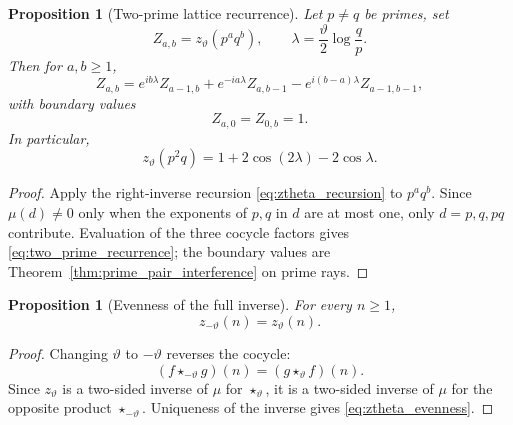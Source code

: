\documentclass[11pt]{amsart}
\numberwithin{equation}{section}
\theoremstyle{plain}
\newtheorem{proposition}[theorem]{Proposition}
\theoremstyle{definition}
\theoremstyle{remark}
\begin{document}
\begin{proposition}[Two-prime lattice recurrence]
\label{prop:two_prime_recurrence}
Let \(p\ne q\) be primes, set
\begin{equation}
Z_{a,b}=z_\vartheta(p^aq^b),
\qquad
\lambda=\frac{\vartheta}{2}\log\frac{q}{p}.
\label{eq:Zab_lambda}
\end{equation}
Then for \(a,b\ge1\),
\begin{equation}
Z_{a,b}
=
e^{ib\lambda}Z_{a-1,b}
+e^{-ia\lambda}Z_{a,b-1}
-e^{i(b-a)\lambda}Z_{a-1,b-1},
\label{eq:two_prime_recurrence}
\end{equation}
with boundary values
\begin{equation}
Z_{a,0}=Z_{0,b}=1.
\label{eq:two_prime_boundary}
\end{equation}
In particular,
\begin{equation}
z_\vartheta(p^2q)
=1+2\cos(2\lambda)-2\cos\lambda.
\label{eq:p2q_formula}
\end{equation}
\end{proposition}

\begin{proof}
Apply the right-inverse recursion \eqref{eq:ztheta_recursion} to
\(p^aq^b\).  Since \(\mu(d)\neq0\) only when the exponents of \(p,q\)
in \(d\) are at most one, only \(d=p,q,pq\) contribute.  Evaluation of
the three cocycle factors gives \eqref{eq:two_prime_recurrence}; the boundary
values are Theorem~\ref{thm:prime_pair_interference} on prime rays.
\end{proof}

\begin{proposition}[Evenness of the full inverse]
\label{prop:theta_evenness}
For every $n\ge1$,
\begin{equation}
z_{-\vartheta}(n)=z_{\vartheta}(n).
\label{eq:ztheta_evenness}
\end{equation}
\end{proposition}

\begin{proof}
Changing $\vartheta$ to $-\vartheta$ reverses the cocycle:
\begin{equation}
(f\star_{-\vartheta}g)(n)
=
(g\star_{\vartheta}f)(n).
\label{eq:opposite_algebra_identity}
\end{equation}
Since $z_{\vartheta}$ is a two-sided inverse of $\mu$ for
$\star_{\vartheta}$, it is a two-sided inverse of $\mu$ for the opposite
product $\star_{-\vartheta}$.  Uniqueness of the inverse gives
\eqref{eq:ztheta_evenness}.
\end{proof}
\end{document}
